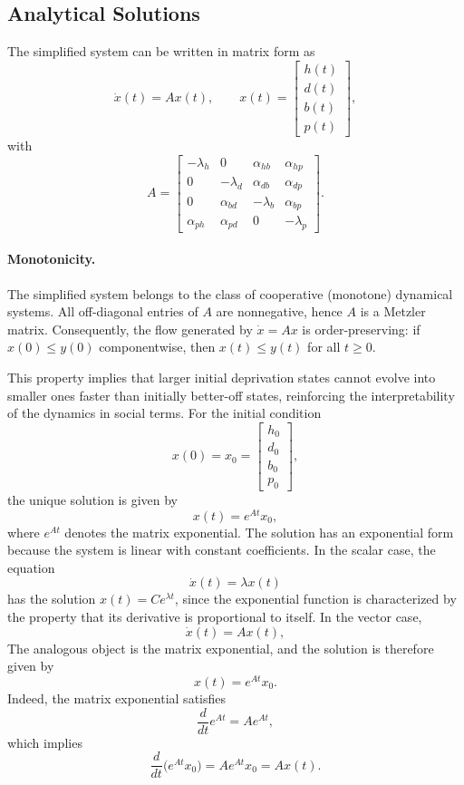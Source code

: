 \documentclass[11pt,a4paper]{article}
\begin{document}
\subsection{Analytical Solutions}\label{Analytical Solutions}
The simplified system can be written in matrix form as
\[
\dot{x}(t)=Ax(t),
\qquad
x(t)=
\begin{bmatrix}
h(t)\\ d(t)\\ b(t)\\ p(t)
\end{bmatrix},
\]
with
\[
A=
\begin{bmatrix}
-\lambda_h & 0 & \alpha_{hb} & \alpha_{hp}\\
0 & -\lambda_d & \alpha_{db} & \alpha_{dp}\\
0 & \alpha_{bd} & -\lambda_b & \alpha_{bp}\\
\alpha_{ph} & \alpha_{pd} & 0 & -\lambda_p
\end{bmatrix}.
\]




\paragraph{Monotonicity.}
The simplified system belongs to the class of cooperative (monotone) dynamical
systems. All off-diagonal entries of $A$ are nonnegative, hence $A$ is a Metzler
matrix. Consequently, the flow generated by $\dot x = Ax$ is order-preserving:
if $x(0)\le y(0)$ componentwise, then $x(t)\le y(t)$ for all $t\ge0$.

This property implies that larger initial deprivation states cannot evolve into
smaller ones faster than initially better-off states, reinforcing the
interpretability of the dynamics in social terms.
For the initial condition
\[
x(0)=x_0=
\begin{bmatrix}
h_0\\ d_0\\ b_0\\ p_0
\end{bmatrix},
\]
the unique solution is given by
\[
x(t)=e^{At}x_0,
\]
where \(e^{At}\) denotes the matrix exponential. 
The solution has an exponential form because the system is linear with constant coefficients. In the scalar case, the equation
\[
\dot{x}(t)=\lambda x(t)
\]
has the solution \(x(t)=Ce^{\lambda t}\), since the exponential function is characterized by the property that its derivative is proportional to itself. In the vector case,
\[
\dot{x}(t)=Ax(t),
\]
The analogous object is the matrix exponential, and the solution is therefore given by
\[
x(t)=e^{At}x_0.
\]
Indeed, the matrix exponential satisfies
\[
\frac{d}{dt}e^{At}=Ae^{At},
\]
which implies
\[
\frac{d}{dt}\bigl(e^{At}x_0\bigr)=Ae^{At}x_0=Ax(t).
\]
\end{document}

